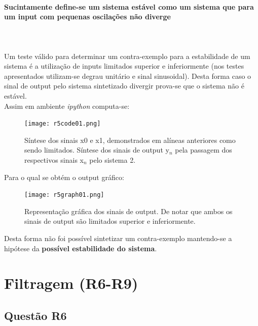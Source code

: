 \documentclass[a4paper,12pt]{article}
\begin{document}
			\paragraph{Sucintamente define-se um sistema estável como um sistema que para um input com pequenas oscilações não diverge}\mbox{}\\\mbox{}\\
			Um teste válido para determinar um contra-exemplo para a estabilidade de um sistema é a utilização de inputs limitados superior e inferiormente (nos testes apresentados utilizam-se degrau unitário e sinal sinusoidal). Desta forma caso o sinal de output pelo sistema sintetizado divergir prova-se que o sistema não é estável.\\
			Assim em ambiente \textit{ipython} computa-se:
                  	\begin{figure}[H]
                        	\centering
                        	\captionsetup{justification=centering}
                        	\texttt{[image: r5code01.png]}
                		\caption{Síntese dos sinais x0 e x1, demonstrados em alíneas anteriores como sendo limitados. Síntese dos sinais de output y$_n$ pela passagem dos respectivos sinais x$_n$ pelo sistema 2.}
                  		\end{figure}
                	Para o qual se obtém o output gráfico:
                  	\begin{figure}[H]
                        	\centering
                        	\captionsetup{justification=centering}
                		\texttt{[image: r5graph01.png]}
                		\caption{Representação gráfica dos sinais de output. De notar que ambos os sinais de output são limitados superior e inferiormente.}
			\end{figure}
			Desta forma não foi possível sintetizar um contra-exemplo mantendo-se a hipótese da \textbf{possível estabilidade do sistema}.
	\section{Filtragem (R6-R9)}
		\subsection{Questão R6}
\end{document}
